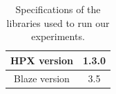\vspace{\baselineskip}	
\begin{table}[H]
	\centering
	\scalebox{0.75}
	{\begin{tabular}{|c | c |} 
			\hline
			HPX version & 1.3.0 \\ [0.5ex] 
			\hline
			Blaze version & 3.5\\ 	
			\hline
			
	\end{tabular}}	
	\caption{Specifications of the libraries used to run our experiments.}
	\label{table5}
\end{table}
%
%
%
%
%
%



